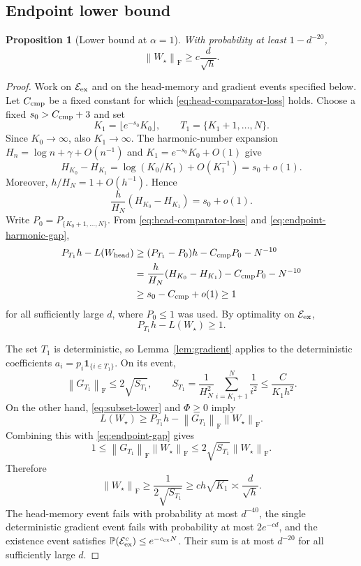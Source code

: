 \documentclass[11pt]{article}
\newtheorem{proposition}[theorem]{Proposition}
\theoremstyle{remark}
\newcommand{\Pp}{\mathbb P}
\newcommand{\norm}[1]{\left\lVert #1\right\rVert}
\newcommand{\F}{\mathrm{F}}
\newcommand{\1}{\mathbf 1}
\begin{document}
\subsection{Endpoint lower bound}

\begin{proposition}[Lower bound at $\alpha=1$]
\label{prop:endpoint-lower}
With probability at least $1-d^{-20}$,
\[
 \norm{W_\star}_{\F}\geq c\frac d{\sqrt h}.
\]
\end{proposition}

\begin{proof}
Work on $\mathcal E_{\rm ex}$ and on the head-memory and gradient
events specified below.  Let $C_{\rm cmp}$ be a fixed constant for
which \eqref{eq:head-comparator-loss} holds.  Choose a fixed
$s_0>C_{\rm cmp}+3$ and set
\[
 K_1=\lfloor e^{-s_0}K_0\rfloor,
 \qquad
 T_1=\{K_1+1,\ldots,N\}.
\]
Since $K_0\to\infty$, also $K_1\to\infty$.  The harmonic-number
expansion $H_n=\log n+\gamma+O(n^{-1})$ and
$K_1=e^{-s_0}K_0+O(1)$ give
\[
 H_{K_0}-H_{K_1}
 =\log(K_0/K_1)+O(K_1^{-1})
 =s_0+o(1).
\]
Moreover, $h/H_N=1+O(h^{-1})$.  Hence
\begin{equation}
 \frac h{H_N}(H_{K_0}-H_{K_1})=s_0+o(1).
 \label{eq:endpoint-harmonic-gap}
\end{equation}
Write $P_0=P_{\{K_0+1,\ldots,N\}}$.  From
\eqref{eq:head-comparator-loss} and
\eqref{eq:endpoint-harmonic-gap},
\begin{align*}
 P_{T_1}h-L(W_{\mathrm{head}})
 &\geq (P_{T_1}-P_0)h-C_{\rm cmp}P_0-N^{-10}\\
 &=\frac h{H_N}(H_{K_0}-H_{K_1})
   -C_{\rm cmp}P_0-N^{-10}\\
 &\geq s_0-C_{\rm cmp}+o(1)\geq1
\end{align*}
for all sufficiently large $d$, where $P_0\leq1$ was used.  By
optimality on $\mathcal E_{\rm ex}$,
\begin{equation}
 P_{T_1}h-L(W_\star)\geq1.
 \label{eq:endpoint-gap}
\end{equation}

The set $T_1$ is deterministic, so Lemma~\ref{lem:gradient} applies to
the deterministic coefficients $a_i=p_i\1_{\{i\in T_1\}}$.  On its
event,
\[
 \norm{G_{T_1}}_{\F}\leq2\sqrt{S_{T_1}},
 \qquad
 S_{T_1}
 =\frac1{H_N^2}\sum_{i=K_1+1}^N\frac1{i^2}
 \leq\frac C{K_1h^2}.
\]
On the other hand, \eqref{eq:subset-lower} and $\Phi\geq0$ imply
\[
 L(W_\star)
 \geq P_{T_1}h-\norm{G_{T_1}}_{\F}\norm{W_\star}_{\F}.
\]
Combining this with \eqref{eq:endpoint-gap} gives
\[
 1\leq\norm{G_{T_1}}_{\F}\norm{W_\star}_{\F}
 \leq2\sqrt{S_{T_1}}\norm{W_\star}_{\F}.
\]
Therefore
\[
 \norm{W_\star}_{\F}
 \geq\frac1{2\sqrt{S_{T_1}}}
 \geq ch\sqrt{K_1}
 \asymp\frac d{\sqrt h}.
\]
The head-memory event fails with probability at most $d^{-40}$, the
single deterministic gradient event fails with probability at most
$2e^{-cd}$, and the existence event satisfies
$\Pp(\mathcal E_{\rm ex}^c)\leq e^{-c_{\rm ex}N}$.  Their sum is at
most $d^{-20}$ for all sufficiently large $d$.
\end{proof}
\end{document}
